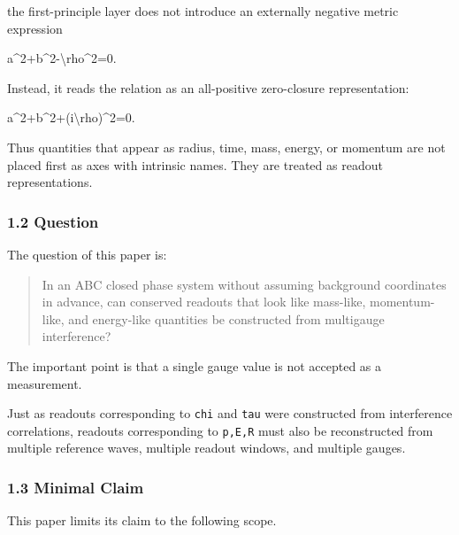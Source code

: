 \documentclass[
  a4paper,
]{article}
\newenvironment{Shaded}{}{}
\newcommand{\NormalTok}[1]{#1}
\begin{document}
the first-principle layer does not introduce an externally negative
metric expression

\begin{Shaded}
\begin{Highlighting}[]
\NormalTok{a\^{}2+b\^{}2{-}\textbackslash{}rho\^{}2=0.}
\end{Highlighting}
\end{Shaded}

Instead, it reads the relation as an all-positive zero-closure
representation:

\begin{Shaded}
\begin{Highlighting}[]
\NormalTok{a\^{}2+b\^{}2+(i\textbackslash{}rho)\^{}2=0.}
\end{Highlighting}
\end{Shaded}

Thus quantities that appear as radius, time, mass, energy, or momentum
are not placed first as axes with intrinsic names. They are treated as
readout representations.

\subsubsection{1.2 Question}\label{question}

The question of this paper is:

\begin{quote}
In an ABC closed phase system without assuming background coordinates in
advance, can conserved readouts that look like mass-like, momentum-like,
and energy-like quantities be constructed from multigauge interference?
\end{quote}

The important point is that a single gauge value is not accepted as a
measurement.

Just as readouts corresponding to \texttt{chi} and \texttt{tau} were
constructed from interference correlations, readouts corresponding to
\texttt{p,E,R} must also be reconstructed from multiple reference waves,
multiple readout windows, and multiple gauges.

\subsubsection{1.3 Minimal Claim}\label{minimal-claim}

This paper limits its claim to the following scope.
\end{document}
